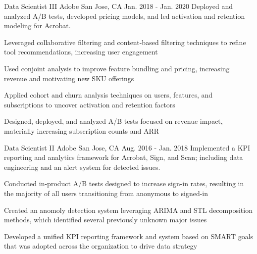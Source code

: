 \begin{cventries}
\cventry
    {Data Scientist III} %
    {Adobe} %
    {San Jose, CA} %
    {Jan. 2018 - Jan. 2020} %
    {Deployed and analyzed A/B tests, developed pricing models, and led activation and retention modeling for Acrobat.} %
    {
      \begin{cvitems} %
        \item {Leveraged collaborative filtering and content-based filtering techniques to refine tool recommendations, increasing user engagement}
        \item {Used conjoint analysis to improve feature bundling and pricing, increasing revenue and motivating new SKU offerings}
        \item {Applied cohort and churn analysis techniques on users, features, and subscriptions to uncover activation and retention factors}
        \item {Designed, deployed, and analyzed A/B tests focused on revenue impact, materially increasing subscription counts and ARR}
      \end{cvitems}
    }

\cventry
    {Data Scientist II} %
    {Adobe} %
    {San Jose, CA} %
    {Aug. 2016 - Jan. 2018} %
    {Implemented a KPI reporting and analytics framework for Acrobat, Sign, and Scan; including data engineering and an alert system for detected issues.} %
    {
      \begin{cvitems} %
        \item {Conducted in-product A/B tests designed to increase sign-in rates, resulting in the majority of all users transitioning from anonymous to signed-in}
        \item {Created an anomoly detection system leveraging ARIMA and STL decomposition methods, which identified several previously unknown major issues}
        \item {Developed a unified KPI reporting framework and system based on SMART goals that was adopted across the organization to drive data strategy}
      \end{cvitems}
    }

\end{cventries}
